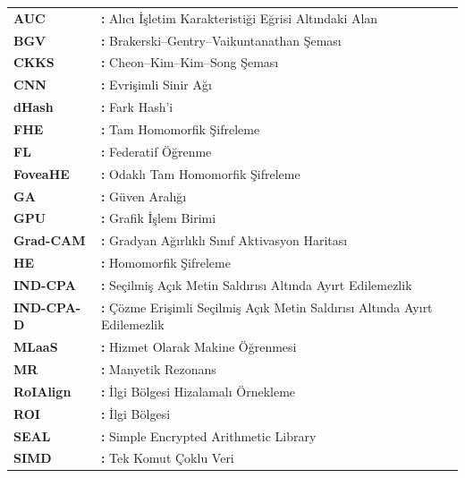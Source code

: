 \hspace{-3mm}
\begin{tabular}{p{3cm}p{10.8cm}}
{\bf AUC} & {\bf:} Alıcı İşletim Karakteristiği Eğrisi Altındaki Alan\\
{\bf BGV} & {\bf:} Brakerski–Gentry–Vaikuntanathan Şeması\\
{\bf CKKS} & {\bf:} Cheon–Kim–Kim–Song Şeması\\
{\bf CNN} & {\bf:} Evrişimli Sinir Ağı\\
{\bf dHash} & {\bf:} Fark Hash'i\\
{\bf FHE} & {\bf:} Tam Homomorfik Şifreleme\\
{\bf FL} & {\bf:} Federatif Öğrenme\\
{\bf FoveaHE} & {\bf:} Odaklı Tam Homomorfik Şifreleme\\
{\bf GA} & {\bf:} Güven Aralığı\\
{\bf GPU} & {\bf:} Grafik İşlem Birimi\\
{\bf Grad-CAM} & {\bf:} Gradyan Ağırlıklı Sınıf Aktivasyon Haritası\\
{\bf HE} & {\bf:} Homomorfik Şifreleme\\
{\bf IND-CPA} & {\bf:} Seçilmiş Açık Metin Saldırısı Altında Ayırt Edilemezlik\\
{\bf IND-CPA-D} & {\bf:} Çözme Erişimli Seçilmiş Açık Metin Saldırısı Altında Ayırt Edilemezlik\\
{\bf MLaaS} & {\bf:} Hizmet Olarak Makine Öğrenmesi\\
{\bf MR} & {\bf:} Manyetik Rezonans\\
{\bf RoIAlign} & {\bf:} İlgi Bölgesi Hizalamalı Örnekleme\\
{\bf ROI} & {\bf:} İlgi Bölgesi\\
{\bf SEAL} & {\bf:} Simple Encrypted Arithmetic Library\\
{\bf SIMD} & {\bf:} Tek Komut Çoklu Veri\\
\end{tabular}
